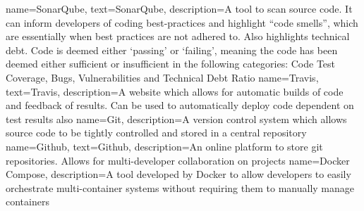 {
    name={SonarQube},
    text={SonarQube},
    description={A tool to scan source code. It can inform developers of coding best-practices and highlight ``code smells'', which are essentially when best practices are not adhered to. Also highlights technical debt. Code is deemed either `passing' or `failing', meaning the code has been deemed either sufficient or insufficient in the following categories: Code Test Coverage, Bugs, Vulnerabilities and Technical Debt Ratio}
}
{
    name={Travis},
    text={Travis},
    description={A website which allows for automatic builds of code and feedback of results. Can be used to automatically deploy code dependent on test results also}
}
{
    name={Git},
    description={A version control system which allows source code to be tightly controlled and stored in a central repository}
}
{
    name={Github},
    text={Github},
    description={An online platform to store git repositories. Allows for multi-developer collaboration on projects}
}
{
    name={Docker Compose},
    description={A tool developed by Docker to allow developers to easily orchestrate multi-container systems without requiring them to manually manage containers}
}
